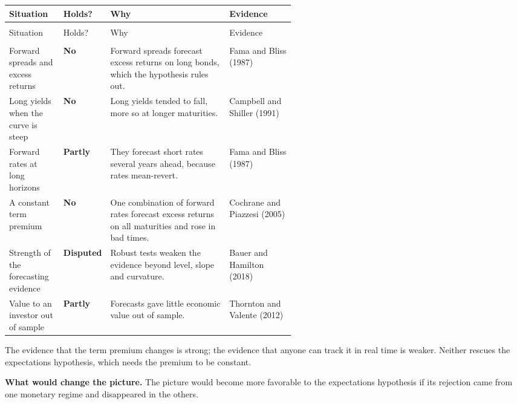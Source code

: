 {\small
\begin{longtable}{@{}>{\raggedright\arraybackslash}p{0.19\linewidth}>{\raggedright\arraybackslash}p{0.13\linewidth}>{\raggedright\arraybackslash}p{}>{\raggedright\arraybackslash}p{0.23\linewidth}@{}}
\toprule
Situation & Holds? & Why & Evidence \\
\midrule
\endfirsthead
\multicolumn{4}{@{}l}{\emph{(continued)}} \\
\toprule
Situation & Holds? & Why & Evidence \\
\midrule
\endhead
\midrule
\multicolumn{4}{r@{}}{\emph{(continued on the next page)}} \\
\endfoot
\bottomrule
\endlastfoot
Forward spreads and excess returns & \textbf{No} & Forward spreads forecast excess returns on long bonds, which the hypothesis rules out. & Fama and Bliss (1987) \\*
\addlinespace[3pt]
Long yields when the curve is steep & \textbf{No} & Long yields tended to fall, more so at longer maturities. & Campbell and Shiller (1991) \\
\addlinespace[3pt]
Forward rates at long horizons & \textbf{Partly} & They forecast short rates several years ahead, because rates mean-revert. & Fama and Bliss (1987) \\
\addlinespace[3pt]
A constant term premium & \textbf{No} & One combination of forward rates forecast excess returns on all maturities and rose in bad times. & Cochrane and Piazzesi (2005) \\
\addlinespace[3pt]
Strength of the forecasting evidence & \textbf{Disputed} & Robust tests weaken the evidence beyond level, slope and curvature. & Bauer and Hamilton (2018) \\*
\addlinespace[3pt]
Value to an investor out of sample & \textbf{Partly} & Forecasts gave little economic value out of sample. & Thornton and Valente (2012) \\
\end{longtable}
\addtocounter{table}{-1}%
}

The evidence that the term premium changes is strong; the evidence that anyone can track it in real time is weaker. Neither rescues the expectations hypothesis, which needs the premium to be constant.

\textbf{What would change the picture.} The picture would become more favorable to the expectations hypothesis if its rejection came from one monetary regime and disappeared in the others.

